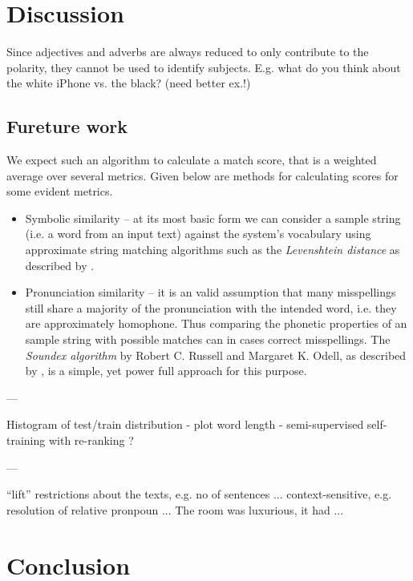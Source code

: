 
\chapter{Discussion}
\label{chap:Conclusion}



Since adjectives and adverbs are always reduced to only contribute to the polarity, they cannot be used to identify subjects. E.g. what do you think about the white iPhone vs. the black? (need better ex.!)

\section{Fureture work}
We expect such an algorithm to calculate a match score, that is a weighted average over several metrics. Given below are methods for calculating scores for some evident metrics.

\begin{itemize}
  \item Symbolic similarity -- at its most basic form we can consider a sample string (i.e. a word from an input text) against the system's vocabulary using approximate string matching algorithms such as the  \emph{Levenshtein distance} as described by \cite{Wagner}.

  \item Pronunciation similarity -- it is an valid assumption that many misspellings still share a majority of the pronunciation with the intended word, i.e. they are approximately homophone. Thus comparing the phonetic properties of an sample string with possible matches can in cases correct misspellings. The \emph{Soundex algorithm} by Robert C. Russell and Margaret K. Odell, as described by \cite[p. 391–92]{ACP3}, is a simple, yet power full approach for this purpose.

\end{itemize}

---

Histogram of test/train distribution - plot word length - semi-supervised self-training with re-ranking ?

---

``lift'' restrictions about the texts, e.g. no of sentences ... context-sensitive, e.g. resolution of relative pronpoun ... The room was luxurious, it had ...

\chapter{Conclusion}
\label{chap:Conclusion}